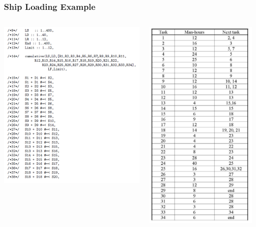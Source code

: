 \documentclass[dvipsnames,aspectratio=169]{beamer}
\begin{document}
\begin{frame}[fragile]
\frametitle{Ship Loading Example}
\begin{columns}
\begin{column}{0.5\textwidth}
\includegraphics[width=.85\textwidth]{images/shiploadingcode}
\end{column}
\begin{column}{0.5\textwidth}
\includegraphics[width=.5\textwidth]{images/shiploading}
\end{column}
\end{columns}
\end{frame}
\end{document}
